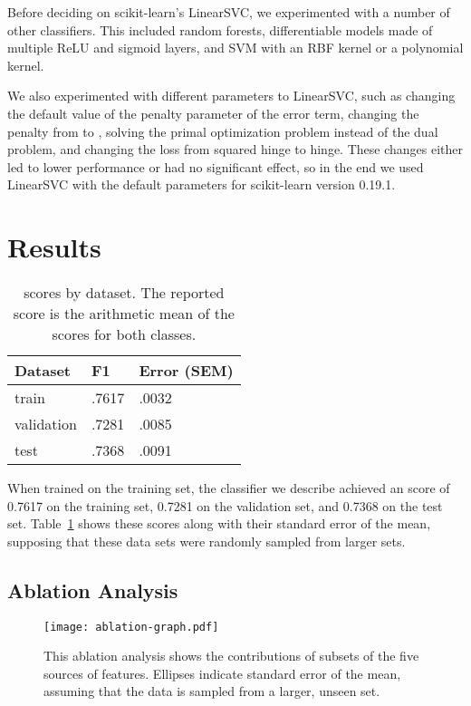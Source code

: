 \documentclass[11pt,a4paper]{article}
\begin{document}
Before deciding on scikit-learn's LinearSVC, we experimented with a number of
other classifiers. This included random forests, differentiable models made of
multiple ReLU and sigmoid layers, and SVM with an RBF kernel or a polynomial
kernel.

We also experimented with different parameters to LinearSVC, such as changing the
default value of the penalty parameter  of the error term, changing the
penalty from  to , solving the primal optimization problem instead of
the dual problem, and changing the loss from squared hinge to hinge. These
changes either led to lower performance or had no significant effect, so in the
end we used LinearSVC with the default parameters for scikit-learn version
0.19.1.

\section{Results}

\begin{table}[t]
\begin{small}
\begin{tabular}{lll}
\textbf{Dataset} & \textbf{F1} & \textbf{Error} (SEM)\\
\hline
train 		& .7617 &  .0032\\
validation	& .7281 &  .0085\\
test		& .7368 &  .0091\\
\end{tabular}
\end{small}
\caption{ scores by dataset. The reported  score is the arithmetic
mean of the  scores for both classes.}
\label{table:results-table}
\end{table}

When trained on the training set, the classifier we describe achieved an 
score of 0.7617 on the training set, 0.7281 on the validation set, and 0.7368
on the test set. Table~\ref{table:results-table} shows these scores along with
their standard error of the mean, supposing that these data sets were randomly
sampled from larger sets.


\subsection{Ablation Analysis}

\begin{figure}[t]
\centering
\texttt{[image: ablation-graph.pdf]}
\caption{This ablation analysis shows the contributions of subsets of the
    five sources of features. Ellipses indicate standard error of the mean,
    assuming that the data is sampled from a larger, unseen set.}
\label{fig:ablation}
\end{figure}
\end{document}
